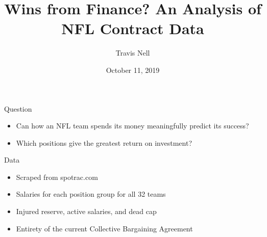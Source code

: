 \documentclass[11pt]{beamer}
\author{Travis Nell}
\title{Wins from Finance? An Analysis of NFL Contract Data}
\date{October 11, 2019}
\begin{document}
\begin{frame}
\titlepage
\end{frame}

\begin{frame}{Question}

\begin{itemize}

\item Can how an NFL team spends its money meaningfully predict its success?

\item Which positions give the greatest return on investment?

\end{itemize}

\end{frame}

\begin{frame}{Data}

\begin{itemize}

\item Scraped from spotrac.com

\item Salaries for each position group for all 32 teams

\item Injured reserve, active salaries, and dead cap 

\item Entirety of the current Collective Bargaining Agreement

\end{itemize}

\end{frame}









\end{document}
